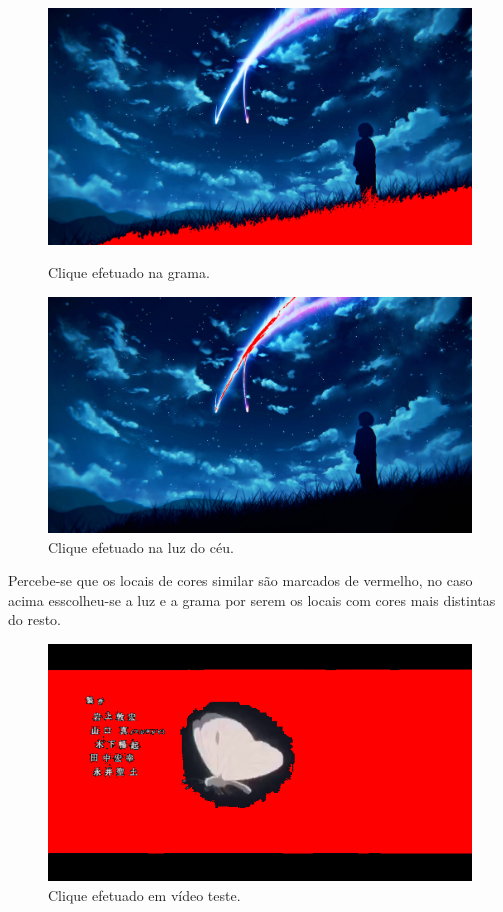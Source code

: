 \documentclass{bmvc2k}
\begin{document}
\begin{figure}[h]
    \centering
    \includegraphics[scale=0.2]{Figs/r21.png}
    \vspace*{-2mm}\caption{Clique efetuado na grama.}
    \vspace{0.1cm}
    \includegraphics[scale=0.2]{Figs/r22.png}
    \vspace*{-2mm}\caption{Clique efetuado na luz do céu.}
    \vspace{0.1cm}
\end{figure}

Percebe-se que os locais de cores similar são marcados de vermelho, no caso acima 
esscolheu-se a luz e a grama por serem os locais com cores mais distintas do resto.

\begin{figure}[h]
    \centering
    \includegraphics[scale=0.5]{Figs/r31.png}
    \vspace*{-2mm}\caption{Clique efetuado em vídeo teste.}
    \vspace{0.1cm}
\end{figure}
\end{document}
